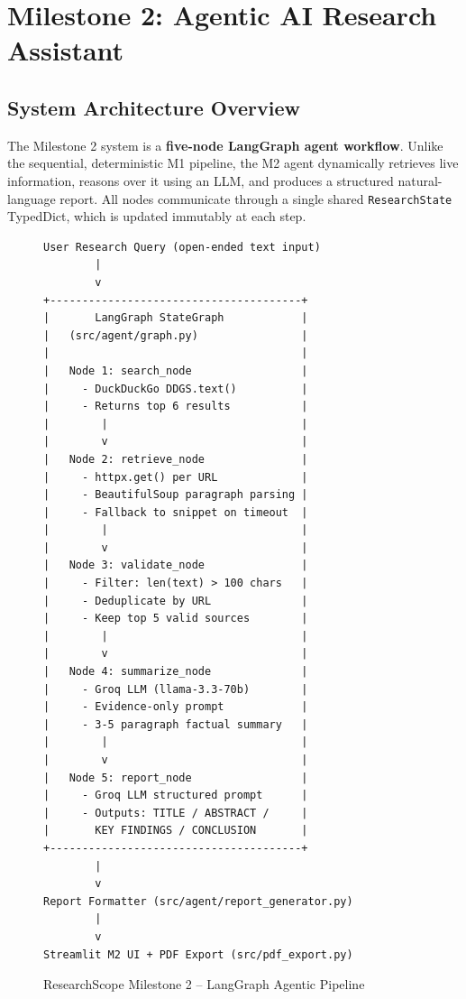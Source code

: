 \documentclass[12pt, a4paper]{article}
\begin{document}
\section{Milestone 2: Agentic AI Research Assistant}

\subsection{System Architecture Overview}

The Milestone 2 system is a \textbf{five-node LangGraph agent workflow}. Unlike the sequential, deterministic M1 pipeline, the M2 agent dynamically retrieves live information, reasons over it using an LLM, and produces a structured natural-language report. All nodes communicate through a single shared \texttt{ResearchState} TypedDict, which is updated immutably at each step.

\begin{figure}[H]
\centering
\begin{lstlisting}[language={}]
User Research Query (open-ended text input)
        |
        v
+---------------------------------------+
|       LangGraph StateGraph            |
|   (src/agent/graph.py)                |
|                                       |
|   Node 1: search_node                 |
|     - DuckDuckGo DDGS.text()          |
|     - Returns top 6 results           |
|        |                              |
|        v                              |
|   Node 2: retrieve_node               |
|     - httpx.get() per URL             |
|     - BeautifulSoup paragraph parsing |
|     - Fallback to snippet on timeout  |
|        |                              |
|        v                              |
|   Node 3: validate_node               |
|     - Filter: len(text) > 100 chars   |
|     - Deduplicate by URL              |
|     - Keep top 5 valid sources        |
|        |                              |
|        v                              |
|   Node 4: summarize_node              |
|     - Groq LLM (llama-3.3-70b)        |
|     - Evidence-only prompt            |
|     - 3-5 paragraph factual summary   |
|        |                              |
|        v                              |
|   Node 5: report_node                 |
|     - Groq LLM structured prompt      |
|     - Outputs: TITLE / ABSTRACT /     |
|       KEY FINDINGS / CONCLUSION       |
+---------------------------------------+
        |
        v
Report Formatter (src/agent/report_generator.py)
        |
        v
Streamlit M2 UI + PDF Export (src/pdf_export.py)
\end{lstlisting}
\caption{ResearchScope Milestone 2 -- LangGraph Agentic Pipeline}
\end{figure}
\end{document}
